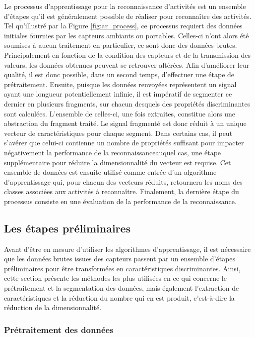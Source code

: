 Le processus d'apprentissage pour la reconnaissance d'activités est un ensemble d'étapes qu'il est généralement possible de réaliser pour reconnaître des activités. Tel qu'illustré par la Figure \ref{fig:ar_process}, ce processus requiert des données initiales fournies par les capteurs ambiants ou portables. Celles-ci n'ont alors été soumises à aucun traitement en particulier, ce sont donc des données brutes. Principalement en fonction de la condition des capteurs et de la transmission des valeurs, les données obtenues peuvent se retrouver altérées. Afin d'améliorer leur qualité, il est donc possible, dans un second temps, d'effectuer une étape de prétraitement. Ensuite, puisque les données renvoyées représentent un signal ayant une longueur potentiellement infinie, il est impératif de segmenter ce dernier en plusieurs fragments, sur chacun desquels des propriétés discriminantes sont calculées. L'ensemble de celles-ci, une fois extraites, constitue alors une abstraction du fragment traité. Le signal fragmenté est donc réduit à un unique vecteur de caractéristiques pour chaque segment. Dans certains cas, il peut s'avérer que celui-ci contienne un nombre de propriétés suffisant pour impacter négativement la performance de la reconnaissance\textemdash auquel cas, une étape supplémentaire pour réduire la dimensionnalité du vecteur est requise. Cet ensemble de données est ensuite utilisé comme entrée d'un algorithme d'apprentissage qui, pour chacun des vecteurs réduits, retournera les noms des classes associées aux activités à reconnaître. Finalement, la dernière étape du processus consiste en une évaluation de la performance de la reconnaissance.

\subsection{Les étapes préliminaires}
\label{sec:prel_steps}

Avant d'être en mesure d'utiliser les algorithmes d'apprentissage, il est nécessaire que les données brutes issues des capteurs passent par un ensemble d'étapes préliminaires pour être transformées en caractéristiques discriminantes. Ainsi, cette section présente les méthodes les plus utilisées en ce qui concerne le prétraitement et la segmentation des données, mais également l'extraction de caractéristiques et la réduction du nombre qui en est produit, c'est-à-dire la réduction de la dimensionnalité.

\subsubsection{Prétraitement des données}

